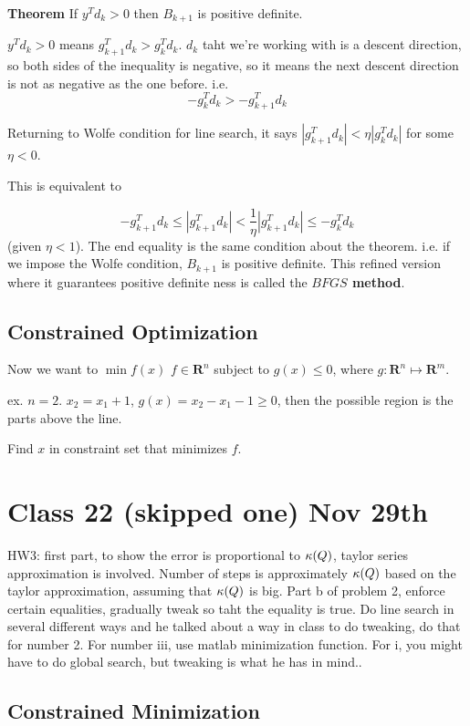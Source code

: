 \textbf{Theorem} If $y^Td_k > 0$ then $B_{k+1}$ is positive definite.

 $y^Td_k>0$ means $g_{k+1}^Td_k > g_k^Td_k$. $d_k$ taht we're working
 with is a descent direction, so both sides of the inequality is
 negative, so it means the next descent direction is not as negative as
 the one before. i.e. $$-g_k^Td_k > -g_{k+1}^Td_k$$

Returning to Wolfe condition for line search, it says $|g_{k+1}^Td_k |<
\eta |g_k^Td_k|$ for some $\eta < 0$.

This is equivalent to

$$-g_{k+1}^Td_k \le |g_{k+1}^Td_k| < \frac{1}{\eta}|g_{k+1}^Td_k| \le
-g_k^Td_k$$
(given $\eta < 1$). The end equality is the same condition about the theorem. i.e. if we
impose the Wolfe condition, $B_{k+1}$ is positive definite.
This refined version where it guarantees positive definite ness is
called the \textbf{$BFGS$ method}.

\subsection{Constrained Optimization}
\label{sec:constrainedoptimization}

Now we want to $ \min f(x)$ $f\in \mathbf{R}^n$ subject to $g(x)
\le 0$, where $g: \mathbf{R}^n \mapsto \mathbf{R}^m$.

ex. $n=2$. $x_2 = x_1+1$, $g(x) = x_2 - x_1 - 1 \ge 0$, then the
possible region is the parts above the line. 

Find $x$ in constraint set that minimizes $f$.
\pagebreak
\section{Class 22 (skipped one) Nov 29th}
HW3: first part, to show the error is proportional to $\kappa(Q)$,
taylor series approximation is involved. Number of steps is
approximately $\kappa(Q)$ based on the taylor approximation, assuming
that $\kappa(Q)$ is big. Part b of problem 2, enforce certain
equalities, gradually tweak so taht the equality is true. Do line
search in several different ways and he talked about a way in class to
do tweaking, do that for number 2. For number iii, use matlab
minimization function. For i, you might have to do global search, but
tweaking is what he has in mind..

\subsection{Constrained Minimization}

